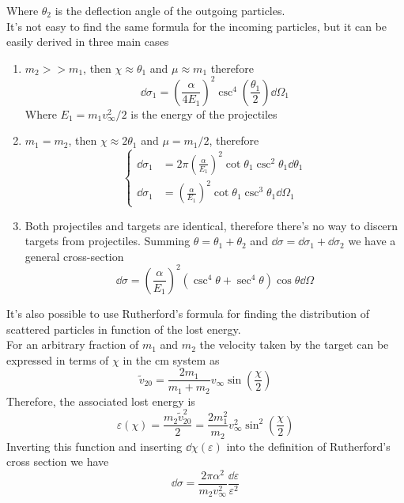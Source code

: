 \documentclass[../admech.tex]{subfiles}
\begin{document}
Where $\theta_2$ is the deflection angle of the outgoing particles.\\
It's not easy to find the same formula for the incoming particles, but it can be easily derived in three main cases
\begin{enumerate}
\item $m_2>>m_{1}$, then $\chi\approx\theta_1$ and $\mu\approx m_1$ therefore
	\begin{equation*}
		\dd\sigma_1=\left( \frac{\alpha}{4E_1} \right)^2\csc^4\left( \frac{\theta_1}{2} \right)\dd\Omega_1
	\end{equation*}
	Where $E_1=m_1v_\infty^2/2$ is the energy of the projectiles
\item $m_1=m_2$, then $\chi\approx2\theta_1$ and $\mu=m_1/2$, therefore
	\begin{equation*}
		\left\{ \begin{aligned}
				\dd\sigma_1&=2\pi\left( \frac{\alpha}{E_1} \right)^2\cot\theta_1\csc^2\theta_1\dd\theta_1\\
				\dd\sigma_1&=\left( \frac{\alpha}{E_1} \right)^2\cot\theta_1\csc^3\theta_1\dd\Omega_1
		\end{aligned}\right.
	\end{equation*}
\item Both projectiles and targets are identical, therefore there's no way to discern targets from projectiles. Summing $\theta=\theta_1+\theta_2$ and $\dd\sigma=\dd\sigma_1+\dd\sigma_2$ we have a general cross-section
	\begin{equation*}
		\dd\sigma=\left( \frac{\alpha}{E_1} \right)^2\left( \csc^4\theta+\sec^4\theta \right)\cos\theta\dd\Omega
	\end{equation*}
\end{enumerate}
It's also possible to use Rutherford's formula for finding the distribution of scattered particles in function of the lost energy.\\
For an arbitrary fraction of $m_1$ and $m_2$ the velocity taken by the target can be expressed in terms of $\chi$ in the cm system as
\begin{equation*}
	\tilde{v}_{20}=\frac{2m_1}{m_1+m_2}v_\infty\sin\left( \frac{\chi}{2} \right)
\end{equation*}
Therefore, the associated lost energy is
\begin{equation*}
	\varepsilon(\chi)=\frac{m_2\tilde{v}_{20}^2}{2}=\frac{2m_1^2}{m_2}v_\infty^2\sin^2\left( \frac{\chi}{2} \right)
\end{equation*}
Inverting this function and inserting $\dd\chi(\varepsilon)$ into the definition of Rutherford's cross section we have
\begin{equation}
	\dd\sigma=\frac{2\pi\alpha^2}{m_2v_\infty^2}\frac{\dd\varepsilon}{\varepsilon^2}
	\label{eq:ruthcsle}
\end{equation}
\end{document}
